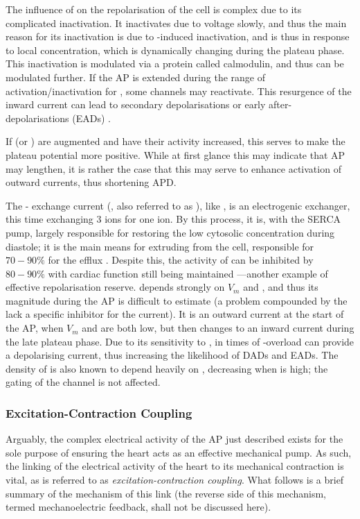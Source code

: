 \documentclass[../thesis-main.tex]{subfiles}
\begin{document}
 The influence of \ica{} on the repolarisation of the cell is complex due to its complicated inactivation. It inactivates due to voltage slowly, and thus the main reason for its inactivation is due to \ca{}-induced inactivation, and is thus in response to local \ca{} concentration, which is dynamically changing during the plateau phase. This inactivation is modulated via a protein called calmodulin, and thus can be modulated further. If the AP is extended during the range of activation/inactivation for \ica{}, some \ica{} channels may reactivate. This resurgence of the inward current can lead to secondary depolarisations or early after-depolarisations (EADs) \citep{Carmeliet2006}. 
 
 If \ica{} (or \ina{}) are augmented and have their activity increased, this serves to make the plateau potential more positive. While at first glance this may indicate that AP may lengthen, it is rather the case that this may serve to enhance activation of outward \K{} currents, thus shortening APD.
 
 The \na{}-\ca{} exchange current (\inaca{}, also referred to as \incx{}), like \inak{}, is an electrogenic exchanger, this time exchanging 3 \na{} ions for one \ca{} ion. By this process, it is, with the SERCA pump, largely responsible for restoring the low cytosolic \ca{} concentration during diastole; it is the main means for extruding \ca{} from the cell, responsible for $70-90\%$ for the \ca{} efflux \citep{Eisner2004}. Despite this, the activity of \inaca{} can be inhibited by $80-90\%$ with cardiac function still being maintained \citep{Henderson2004}---another example of effective repolarisation reserve. \inaca{} depends strongly on $V_m$ and \cai{}, and thus its magnitude during the AP is difficult to estimate (a problem compounded by the lack a specific inhibitor for the current). It is an outward current at the start of the AP, when $V_m$ and \cai{} are both low, but then changes to an inward current during the late plateau phase. Due to its sensitivity to \cai{}, in times of \ca{}-overload \inaca{} can provide a depolarising current, thus increasing the likelihood of DADs and EADs. The density of \ina{} is also known to depend heavily on \cai{}, decreasing when \cai{} is high; the gating of the channel is not affected.
 
 \subsubsection{Excitation-Contraction Coupling}
 \label{subsubsec:ecc}
 Arguably, the complex electrical activity of the AP just described exists for the sole purpose of ensuring the heart acts as an effective mechanical pump. As such, the linking of the electrical activity of the heart to its mechanical contraction is vital, as is referred to as \emph{excitation-contraction coupling}. What follows is a brief summary of the mechanism of this link (the reverse side of this mechanism, termed mechanoelectric feedback, shall not be discussed here).
 
\end{document}
